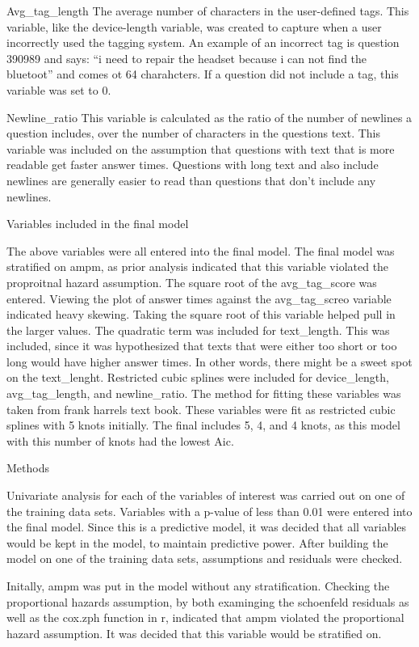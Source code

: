 \documentclass[12pt]{article}
\begin{document}
Avg_tag_length
The average number of characters in the user-defined tags. This variable, like the device-length variable, was created to capture when a user incorrectly used the tagging system. An example of an incorrect tag is question 390989 and says: “i need to repair the headset because i can not find the bluetoot” and comes ot 64 charahcters. If a question did not include a tag, this variable was set to 0. 

Newline_ratio
This variable is calculated as the ratio of the number of newlines a question includes, over the number of characters in the questions text. This variable was included on the assumption that questions with text that is more readable get faster answer times. Questions with long text and also include newlines are generally easier to read than questions that don’t include any newlines. 

Variables included in the final model 

The above variables were all entered into the final model. The final model was stratified on ampm, as prior analysis indicated that this variable violated the proproitnal hazard assumption. The square root of the avg_tag_score was entered. Viewing the plot of answer times against the avg_tag_screo variable indicated heavy skewing. Taking the square root of this variable helped pull in the larger values. The quadratic term was included for text_length. This was included, since it was hypothesized that texts that were either too short or too long would have higher answer times. In other words, there might be a sweet spot on the text_lenght. Restricted cubic splines were included for device_length, avg_tag_length, and newline_ratio. The method for fitting these variables was taken from frank harrels text book. These variables were fit as restricted cubic splines with 5 knots initially. The final includes 5, 4, and 4 knots, as this model with this number of knots had the lowest Aic. 

Methods 

Univariate analysis for each of the variables of interest was carried out on one of the training data sets. Variables with a p-value of less than 0.01 were entered into the final model. Since this is a predictive model, it was decided that all variables would be kept in the model, to maintain predictive power. After building the model on one of the training data sets, assumptions and residuals were checked. 

Initally, ampm was put in the model without any stratification. Checking the proportional hazards assumption, by both examinging the schoenfeld residuals as well as the cox.zph function in r, indicated that ampm violated the proportional hazard assumption. It was decided that this variable would be stratified on. 
\end{document}
